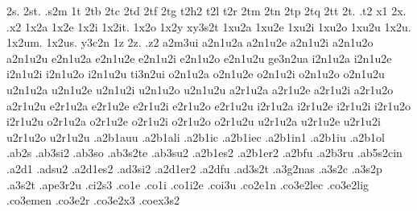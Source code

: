 {     2s.  2st.  .s2m  
1t   2tb  2tc   2td   2tf  2tg  t2h2  t2l  t2r  2tm  2tn  2tp  2tq  2tt
     2t. .t2
x1   2x. .x2 
1x2a  1x2e  1x2i  1x2it. 1x2o 1x2y  
xy3s2t %
1xu2a 1xu2e 1xu2i 1xu2o 1xu2u 1x2u. 1x2um.  1x2us.
%
y3c2n
1z   2z. .z2
%
%
a2m3ui
%
a2n1u2a a2n1u2e a2n1u2i a2n1u2o a2n1u2u
e2n1u2a e2n1u2e e2n1u2i e2n1u2o e2n1u2u ge3n2ua
i2n1u2a i2n1u2e i2n1u2i i2n1u2o i2n1u2u ti3n2ui
o2n1u2a o2n1u2e o2n1u2i o2n1u2o o2n1u2u
u2n1u2a u2n1u2e u2n1u2i u2n1u2o u2n1u2u
%
a2r1u2a a2r1u2e a2r1u2i a2r1u2o a2r1u2u
e2r1u2a e2r1u2e e2r1u2i e2r1u2o e2r1u2u
i2r1u2a i2r1u2e i2r1u2i i2r1u2o i2r1u2u
o2r1u2a o2r1u2e o2r1u2i o2r1u2o o2r1u2u
u2r1u2a u2r1u2e u2r1u2i u2r1u2o u2r1u2u
%
.a2b1auu                           %
.a2b1ali                           %
.a2b1ic .a2b1iec .a2b1in1            %
.a2b1iu                            %
.a2b1ol                            %
.ab2s
.ab3si2                           %
.ab3so                            %
.ab3s2te                          %
.ab3su2 .a2b1es2  .a2b1er2        %
.a2bfu                            %
.a2b3ru                           %
.ab5s2cin                         %
.a2d1
.adsu2 .a2d1es2 .ad3si2 .a2d1er2  %
.a2dfu                            %
.ad3s2t                           %
.a3g2nas                          %
.a3s2c                            %
.a3s2p                            %
.a3s2t                            %
.ape3r2u                          %
.ci2s3                            %
.co1e .co1i .co1i2e .coi3u %
.co2e1n                           %
.co3e2lec .co3e2lig               %
.co3emen                          %
.co3e2r                           %
.co3e2x3                          %
.coex3s2                          %
}
